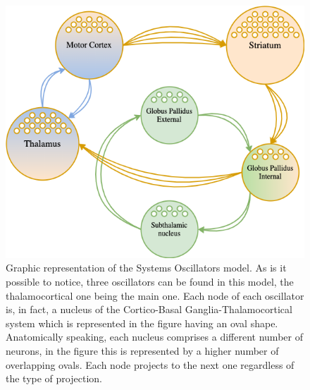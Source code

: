 \documentclass[MSc,english]{Container/thesistemplate}
\begin{document}
\begin{figure}[ht!]
    \centering
    \includegraphics[scale=.5]{Images/systemsoscillatorstheory2}
    \caption{Graphic representation of the Systems Oscillators model. As is it possible to notice, three oscillators can be found in this model, the thalamocortical one being the main one. Each node of each oscillator is, in fact, a nucleus of the Cortico-Basal Ganglia-Thalamocortical system which is represented in the figure having an oval shape. Anatomically speaking, each nucleus comprises a different number of neurons, in the figure this is represented by a higher number of overlapping ovals. Each node projects to the next one regardless of the type of projection.}
    \label{fig:sysosc}
\end{figure}
\end{document}
